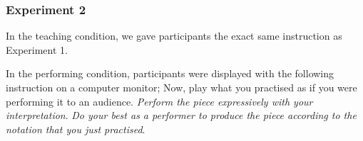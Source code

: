 \documentclass[
  english,
  man,floatsintext]{apa6}
\begin{document}
\hypertarget{experiment-2-1}{%
\subsubsection{Experiment 2}\label{experiment-2-1}}

In the teaching condition, we gave participants the exact same instruction as Experiment 1.

In the performing condition, participants were displayed with the following instruction on a computer monitor; Now, play what you practised as if you were performing it to an audience. \emph{Perform the piece expressively with your interpretation}. \emph{Do your best as a performer to produce the piece according to the notation that you just practised}.
\end{document}
